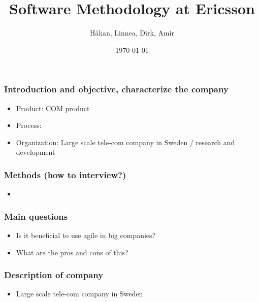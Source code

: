 \documentclass{beamer}
\begin{document}



\title{Software Methodology at Ericsson}
\author{H\aa kan, Linnea, Dirk, Amir}

\date{\today}

\begin{frame}
\titlepage
\end{frame}

\begin{frame}\frametitle{Introduction and objective, characterize the company}
\begin{itemize}
\item Product: COM product
\item Process:
\item Organization: Large scale tele-com company in Sweden / research
  and development
\end{itemize}
\end{frame}

\begin{frame}
  \frametitle{Methods (how to interview?)}
  \begin{itemize}
  \item
  \end{itemize}
\end{frame}

\begin{frame}
  \frametitle{Main questions}
  \begin{itemize}
  \item Is it beneficial to use agile in big companies?
  \item What are the pros and cons of this?
  \end{itemize}
\end{frame}

\begin{frame}
  \frametitle{Description of company}
  \begin{itemize}
  \item  Large scale tele-com company in Sweden
  \end{itemize}
\end{frame}
\end{document}
